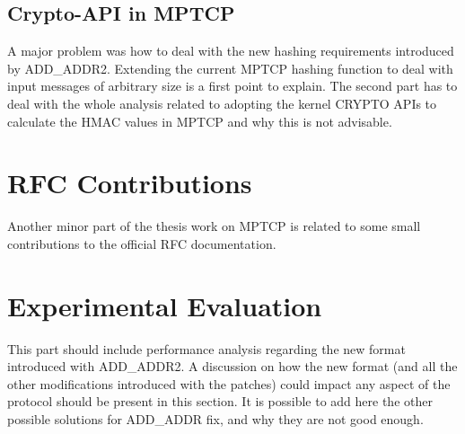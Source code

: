 \subsection{Crypto-API in MPTCP}
A major problem was how to deal with the new hashing requirements introduced by ADD\_ADDR2. Extending the current MPTCP hashing function to deal with input messages of arbitrary size is a first point to explain. The second part has to deal with the whole analysis related to adopting the kernel CRYPTO APIs to calculate the HMAC values in MPTCP and why this is not advisable.

\section{RFC Contributions}
Another minor part of the thesis work on MPTCP is related to some small contributions to the official RFC documentation.

\section{Experimental Evaluation}
This part should include performance analysis regarding the new format introduced with ADD\_ADDR2. A discussion on how the new format (and all the other modifications introduced with the patches) could impact any aspect of the protocol should be present in this section.
It is possible to add here the other possible solutions for ADD\_ADDR fix, and why they are not good enough. 